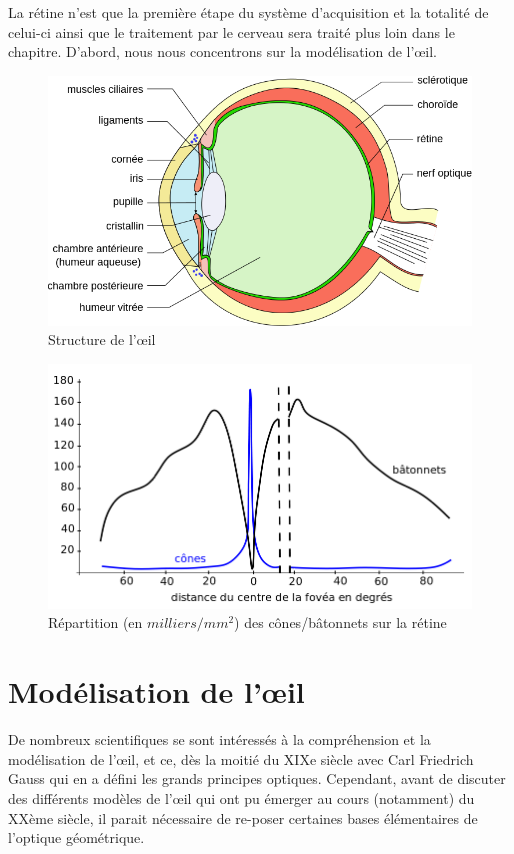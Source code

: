 	\par La rétine n'est que la première étape du système d'acquisition et la totalité de celui-ci ainsi que le traitement par le cerveau sera traité plus loin dans le chapitre. D'abord, nous nous concentrons sur la modélisation de l'œil.
	
	\begin{figure}[h]
		\centering
		\includegraphics[scale=.4]{Figures/SchemaOeil}
		\caption{Structure de l'œil}
		\label{fig:oeil}
	\end{figure}
	
	\begin{figure}[h]
		\centering
		\includegraphics[scale=.5]{Figures/DensiteConesBatonnets}
		\caption{Répartition (en $milliers/mm^2$) des cônes/bâtonnets sur la rétine}
		\label{fig:densite_cones_batonnets}
	\end{figure}
	
	\section{Modélisation de l'œil}
	\par De nombreux scientifiques se sont intéressés à la compréhension et la modélisation de l'œil, et ce, dès la moitié du XIXe siècle avec Carl Friedrich Gauss qui en a défini les grands principes optiques. Cependant, avant de discuter des différents modèles de l'œil qui ont pu émerger au cours (notamment) du XXème siècle, il parait nécessaire de re-poser certaines bases élémentaires de l'optique géométrique.
	
